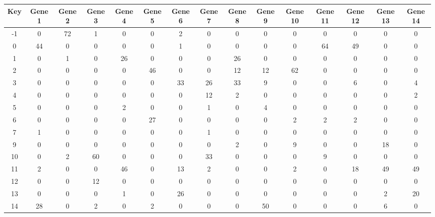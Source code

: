 \begin{tabular}{|c|c|c|c|c|c|c|c|c|c|c|c|c|c|c|}
\hline
Key & Gene 1 & Gene 2 & Gene 3 & Gene 4 & Gene 5 & Gene 6 & Gene 7 & Gene 8 & Gene 9 & Gene 10 & Gene 11 & Gene 12 & Gene 13 & Gene 14 \\
\hline
-1 & 0 & 72 & 1 & 0 & 0 & 2 & 0 & 0 & 0 & 0 & 0 & 0 & 0 & 0 \\
0 & 44 & 0 & 0 & 0 & 0 & 1 & 0 & 0 & 0 & 0 & 64 & 49 & 0 & 0 \\
1 & 0 & 1 & 0 & 26 & 0 & 0 & 0 & 26 & 0 & 0 & 0 & 0 & 0 & 0 \\
2 & 0 & 0 & 0 & 0 & 46 & 0 & 0 & 12 & 12 & 62 & 0 & 0 & 0 & 0 \\
3 & 0 & 0 & 0 & 0 & 0 & 33 & 26 & 33 & 9 & 0 & 0 & 6 & 0 & 4 \\
4 & 0 & 0 & 0 & 0 & 0 & 0 & 12 & 2 & 0 & 0 & 0 & 0 & 0 & 2 \\
5 & 0 & 0 & 0 & 2 & 0 & 0 & 1 & 0 & 4 & 0 & 0 & 0 & 0 & 0 \\
6 & 0 & 0 & 0 & 0 & 27 & 0 & 0 & 0 & 0 & 2 & 2 & 2 & 0 & 0 \\
7 & 1 & 0 & 0 & 0 & 0 & 0 & 1 & 0 & 0 & 0 & 0 & 0 & 0 & 0 \\
9 & 0 & 0 & 0 & 0 & 0 & 0 & 0 & 2 & 0 & 9 & 0 & 0 & 18 & 0 \\
10 & 0 & 2 & 60 & 0 & 0 & 0 & 33 & 0 & 0 & 0 & 9 & 0 & 0 & 0 \\
11 & 2 & 0 & 0 & 46 & 0 & 13 & 2 & 0 & 0 & 2 & 0 & 18 & 49 & 49 \\
12 & 0 & 0 & 12 & 0 & 0 & 0 & 0 & 0 & 0 & 0 & 0 & 0 & 0 & 0 \\
13 & 0 & 0 & 0 & 1 & 0 & 26 & 0 & 0 & 0 & 0 & 0 & 0 & 2 & 20 \\
14 & 28 & 0 & 2 & 0 & 2 & 0 & 0 & 0 & 50 & 0 & 0 & 0 & 6 & 0 \\
\hline
\end{tabular}